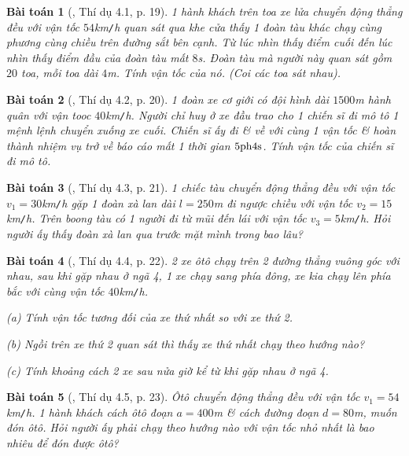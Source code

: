 \documentclass{article}
\numberwithin{equation}{section}
\newtheorem{baitoan}{Bài toán}[section]
\begin{document}
\begin{baitoan}[\cite{Giai_Toan_Vat_Ly_10_tap_1}, Thí dụ 4.1, p. 19]
	1 hành khách trên toa xe lửa chuyển động thẳng đều với vận tốc $54$\emph{km\texttt{/}h} quan sát qua khe cửa thấy 1 đoàn tàu khác chạy cùng phương cùng chiều trên đường sắt bên cạnh. Từ lúc nhìn thấy điểm cuối đến lúc nhìn thấy điểm đầu của đoàn tàu mất $8$\emph{s}. Đoàn tàu mà người này quan sát gồm $20$ toa, mỗi toa dài $4$\emph{m}. Tính vận tốc của nó. (Coi các toa sát nhau).
\end{baitoan}

\begin{baitoan}[\cite{Giai_Toan_Vat_Ly_10_tap_1}, Thí dụ 4.2, p. 20]
	1 đoàn xe cơ giới có đội hình dài $1500$\emph{m} hành quân với vận tooc $40$\emph{km\texttt{/}h}. Người chỉ huy ở xe đầu trao cho 1 chiến sĩ đi mô tô 1 mệnh lệnh chuyển xuống xe cuối. Chiến sĩ ấy đi \& về với cùng 1 vận tốc \& hoàn thành nhiệm vụ trở về báo cáo mất 1 thời gian $\rm 5ph4s$. Tính vận tốc của chiến sĩ đi mô tô.
\end{baitoan}

\begin{baitoan}[\cite{Giai_Toan_Vat_Ly_10_tap_1}, Thí dụ 4.3, p. 21]
	1 chiếc tàu chuyển động thẳng đều với vận tốc $v_1 = 30$\emph{km\texttt{/}h} gặp 1 đoàn xà lan dài $l = 250$\emph{m} đi ngược chiều với vận tốc $v_2 = 15$\emph{km\texttt{/}h}. Trên boong tàu có 1 người đi từ mũi đến lái với vận tốc $v_3 = 5$\emph{km\texttt{/}h}. Hỏi người ấy thấy đoàn xà lan qua trước mặt mình trong bao lâu?
\end{baitoan}

\begin{baitoan}[\cite{Giai_Toan_Vat_Ly_10_tap_1}, Thí dụ 4.4, p. 22]
	2 xe ôtô chạy trên 2 đường thẳng vuông góc với nhau, sau khi gặp nhau ở ngã 4, 1 xe chạy sang phía đông, xe kia chạy lên phía bắc với cùng vận tốc $40$\emph{km\texttt{/}h}.
	\begin{enumerate*}
		\item[(a)] Tính vận tốc tương đối của xe thứ nhất so với xe thứ 2.
		\item[(b)] Ngồi trên xe thứ 2 quan sát thì thấy xe thứ nhất chạy theo hướng nào?
		\item[(c)] Tính khoảng cách 2 xe sau nửa giờ kể từ khi gặp nhau ở ngã 4.
	\end{enumerate*}
\end{baitoan}

\begin{baitoan}[\cite{Giai_Toan_Vat_Ly_10_tap_1}, Thí dụ 4.5, p. 23]
	Ôtô chuyển động thẳng đều với vận tốc $v_1 = 54$\emph{km\texttt{/}h}. 1 hành khách cách ôtô đoạn $a = 400$\emph{m} \& cách đường đoạn $d = 80$\emph{m}, muốn đón ôtô. Hỏi người ấy phải chạy theo hướng nào với vận tốc nhỏ nhất là bao nhiêu để đón được ôtô?
\end{baitoan}
\end{document}
